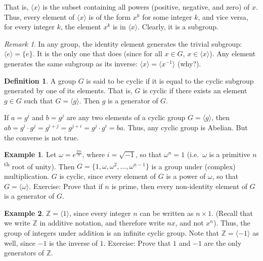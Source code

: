 \documentclass[svgnames]{article}
\theoremstyle{definition}
\newtheorem{Definition}[Definition]{Definition}
\newtheorem{Example}[Example]{Example}
\theoremstyle{remark}
\newtheorem*{Remark*}{Remark}
\newcommand{\nth}{\textsuperscript{th}\xspace}
\newcommand{\newterm}[1]{{\color{alertcolor} #1}}
\begin{document}
That is, $\langle x \rangle$ is the subset containing all powers (positive, negative, and zero) of $x$. Thus, every element of $\langle x \rangle$ is of the form $x^k$ for some integer $k$, and vice versa, for every integer $k$, the element $x^k$ is in $\langle x \rangle$. Clearly, it is a subgroup.

\begin{Remark*}
In any group, the identity element generates the trivial subgroup: $\langle e \rangle = \{e\}$. It is the only one that does (since for all $x \in G$, $x \in \langle x \rangle$). Any element generates the same subgroup as its inverse: $\langle x \rangle = \langle x^{-1} \rangle$ (why?).
\end{Remark*}

\begin{Definition}
A group $G$ is said to be \newterm{cyclic} if it is equal to the cyclic subgroup generated by one of its elements. That is, $G$ is cyclic if there exists an element $g \in G$ such that $G = \langle g \rangle$. Then $g$ is a \newterm{generator} of $G$.
\end{Definition}

If $a = g^i$ and $b = g^j$ are any two elements of a cyclic group $G = \langle g \rangle$, then $ab = g^i \cdot g^j = g^{i + j} = g^{j + i} = g^j \cdot g^i = ba$. Thus, any cyclic group is Abelian. But the converse is not true.

\begin{Example}\label{ex:RootsOfUnity}
Let $\omega = e^{\frac{2 \pi i}{n}}$, where $i = \sqrt{-1}$, so that $\omega^n = 1$ (i.e.\ $\omega$ is a primitive $n$\nth root of unity). Then $G = \{1, \omega, \omega^2, \ldots, \omega^{n - 1}\}$ is a group under (complex) multiplication. $G$ is cyclic, since every element of $G$ is a power of $\omega$, so that $G = \langle \omega \rangle$. {\small Exercise: Prove that if $n$ is prime, then every non-identity element of $G$ is a generator of $G$}.
\end{Example}

\begin{Example}
$\mathbb Z = \langle 1 \rangle$, since every integer $n$ can be written as $n \times 1$. (Recall that we write $\mathbb Z$ in additive notation, and therefore write $nx$, and not $x^n$). Thus, the group of integers under addition is an infinite cyclic group. Note that $\mathbb Z = \langle -1 \rangle$ as well, since $-1$ is the inverse of $1$. {\small Exercise: Prove that $1$ and $-1$ are the only generators of $\mathbb Z$}.
\end{Example}
\end{document}
